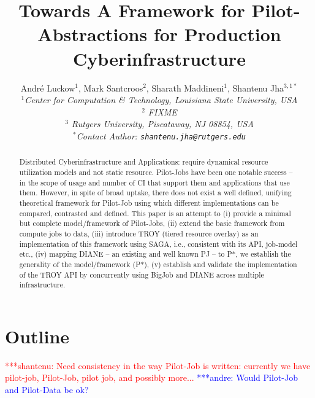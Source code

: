 \documentclass[conference,final]{IEEEtran}
\title{Towards A Framework for Pilot-Abstractions for Production
  Cyberinfrastructure}
\date{}
\newcommand{\jhanote}[1]{ {\textcolor{red} { ***shantenu: #1 }}}
\newcommand{\alnote}[1]{ {\textcolor{blue} { ***andre: #1 }}}
\newcommand{\alnote}[1]{}
\newcommand{\jhanote}[1]{}
\newcommand{\up}{\vspace*{-1em}}
\begin{document}
\ifpdf
{}
\else
{}
\fi

\author{
  Andr\'e Luckow$^{1}$, Mark Santcroos$^{2}$, Sharath Maddineni$^{1}$, Shantenu Jha$^{3,1*}$\\
  \small{\emph{$^{1}$Center for Computation \& Technology, Louisiana State University, USA}}\\
 \small{\emph{$^{2}$ FIXME}}\\
 \small{\emph{$^{3}$ Rutgers University, Piscataway, NJ 08854, USA}}\\
  \small{\emph{$^{*}$Contact Author: \texttt{shantenu.jha@rutgers.edu}}}\\
  \up\up\up\up }

\maketitle

\begin{abstract}
  Distributed Cyberinfrastructure and Applications: require dynamical
  resource utilization models and not static resource.  Pilot-Jobs
  have been one notable success -- in the scope of usage and number of
  CI that support them and applications that use them.  However, in
  spite of broad uptake, there does not exist a well defined, unifying
  theoretical framework for Pilot-Job using which different
  implementations can be compared, contrasted and defined. This paper
  is an attempt to (i) provide a minimal but complete model/framework
  of Pilot-Jobs, (ii) extend the basic framework from compute jobs to
  data, (iii) introduce TROY (tiered resource overlay) as an
  implementation of this framework using SAGA, i.e., consistent with
  its API, job-model etc., (iv) mapping DIANE -- an existing and well
  known PJ -- to P*, we establish the generality of the
  model/framework (P*), (v) establish and validate the implementation
  of the TROY API by concurrently using BigJob and DIANE across
  multiple infrastructure.
\end{abstract}

\section*{Outline}

\jhanote{Need consistency in the way Pilot-Job is written: currently
  we have pilot-job, Pilot-Job, pilot job, and possibly more...} \alnote{Would 
Pilot-Job and Pilot-Data be ok?}
\end{document}
